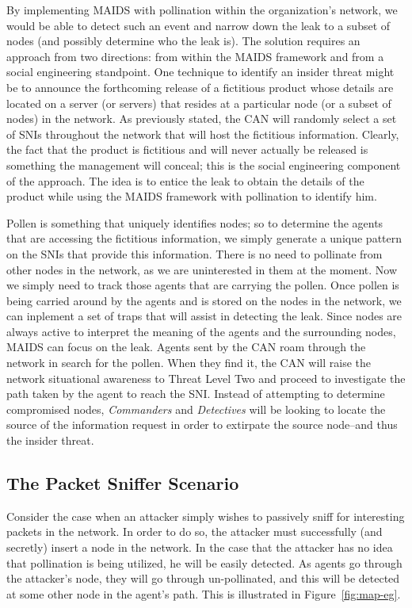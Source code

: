 \documentclass{acm_proc_article-sp}
\begin{document}
By implementing MAIDS with pollination within the organization's network, we would be able to detect such an event and narrow down the leak to a subset of nodes (and possibly determine who the leak is).  The solution requires an approach from two directions: from within the MAIDS framework and from a social engineering standpoint.  One technique to identify an insider threat might be to announce the forthcoming release of a fictitious product whose details are located on a server (or servers) that resides at a particular node (or a subset of nodes) in the network.  As previously stated, the CAN will randomly select a set of SNIs throughout the network that will host the fictitious information.  Clearly, the fact that the product is fictitious and will never actually be released is something the management will conceal; this is the social engineering component of the approach.  The idea is to entice the leak to obtain the details of the product while using the MAIDS framework with pollination to identify him.

Pollen is something that uniquely identifies nodes; so to determine the agents that are accessing the fictitious information, we simply generate a unique pattern on the SNIs that provide this information.  There is no need to pollinate from other nodes in the network, as we are uninterested in them at the moment.  Now we simply need to track those agents that are carrying the pollen.  Once pollen is being carried around by the agents and is stored on the nodes in the network, we can inplement a set of traps that will assist in detecting the leak.  Since nodes are always active to interpret the meaning of the agents and the surrounding nodes, MAIDS can focus on the leak.  Agents sent by the CAN roam through the network in search for the pollen.  When they find it, the CAN will raise the network situational awareness to Threat Level Two and proceed to investigate the path taken by the agent to reach the SNI.  Instead of attempting to determine compromised nodes, {\it Commanders} and {\it Detectives} will be looking to locate the source of the information request in order to extirpate the source node--and thus the insider threat.

\subsection{The Packet Sniffer Scenario}
Consider the case when an attacker simply wishes to passively sniff for interesting packets in the network.  In order to do so, the attacker must successfully (and secretly) insert a node in the network.  In the case that the attacker has no idea that pollination is being utilized, he will be easily detected.  As agents go through the attacker's node, they will go through un-pollinated, and this will be detected at some other node in the agent's path.  This is illustrated in Figure~\ref{fig:map-eg}.
\end{document}
